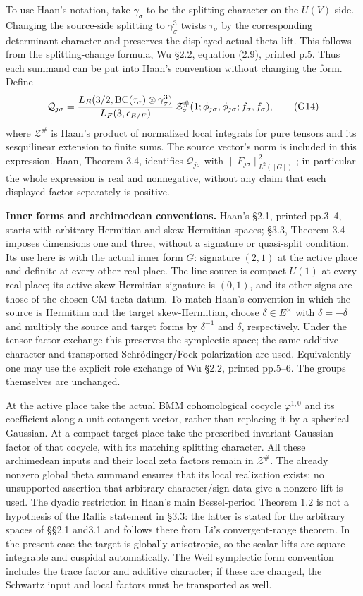 To use Haan's notation, take \(\gamma_\sigma\) to be the splitting character on the \(U(V)\) side. Changing the source-side splitting to \(\gamma_\sigma^3\) twists \(\tau_\sigma\) by the corresponding determinant character and preserves the displayed actual theta lift. This follows from the splitting-change formula, Wu §2.2, equation (2.9), printed p.5. Thus each summand can be put into Haan's convention without changing the form. Define \[
\mathcal Q_{j\sigma}=
{L_E(3/2,\operatorname{BC}(\tau_\sigma)\otimes\gamma_\sigma^3)
 \over L_F(3,\epsilon_{E/F})}
\,\mathcal Z^\#_\sigma(1;\phi_{j\sigma},\phi_{j\sigma};f_\sigma,f_\sigma),
\tag{G14}
\] where \(\mathcal Z^\#\) is Haan's product of normalized local integrals for pure tensors and its sesquilinear extension to finite sums. The source vector's norm is included in this expression. Haan, Theorem 3.4, identifies \(\mathcal Q_{j\sigma}\) with \(\|F_{j\sigma}\|^2_{L^2([G])}\); in particular the whole expression is real and nonnegative, without any claim that each displayed factor separately is positive.

\textbf{Inner forms and archimedean conventions.} Haan's §2.1, printed pp.3--4, starts with arbitrary Hermitian and skew-Hermitian spaces; §3.3, Theorem 3.4 imposes dimensions one and three, without a signature or quasi-split condition. Its use here is with the actual inner form \(G\): signature \((2,1)\) at the active place and definite at every other real place. The line source is compact \(U(1)\) at every real place; its active skew-Hermitian signature is \((0,1)\), and its other signs are those of the chosen CM theta datum. To match Haan's convention in which the source is Hermitian and the target skew-Hermitian, choose \(\delta\in E^\times\) with \(\bar\delta=-\delta\) and multiply the source and target forms by \(\delta^{-1}\) and \(\delta\), respectively. Under the tensor-factor exchange this preserves the symplectic space; the same additive character and transported Schrödinger/Fock polarization are used. Equivalently one may use the explicit role exchange of Wu §2.2, printed pp.5--6. The groups themselves are unchanged.

At the active place take the actual BMM cohomological cocycle \(\varphi^{1,0}\) and its coefficient along a unit cotangent vector, rather than replacing it by a spherical Gaussian. At a compact target place take the prescribed invariant Gaussian factor of that cocycle, with its matching splitting character. All these archimedean inputs and their local zeta factors remain in \(\mathcal Z^\#\). The already nonzero global theta summand ensures that its local realization exists; no unsupported assertion that arbitrary character/sign data give a nonzero lift is used. The dyadic restriction in Haan's main Bessel-period Theorem 1.2 is not a hypothesis of the Rallis statement in §3.3: the latter is stated for the arbitrary spaces of §§2.1 and3.1 and follows there from Li's convergent-range theorem. In the present case the target is globally anisotropic, so the scalar lifts are square integrable and cuspidal automatically. The Weil symplectic form convention includes the trace factor and additive character; if these are changed, the Schwartz input and local factors must be transported as well.

